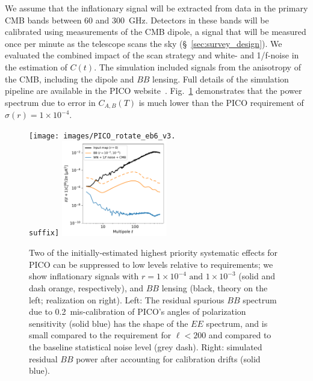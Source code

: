 \documentclass[PICOReport.tex]{subfiles}
\begin{document}
We assume that the inflationary signal will be extracted from data in the primary CMB bands between 60 and 300~GHz.  Detectors in these bands will be calibrated using measurements of the CMB dipole, a signal that will be measured once per minute as the telescope scans the sky (\S~\ref{sec:survey_design}).  We evaluated the combined impact of the scan strategy and white- and 1/f-noise in the estimation of $C(t)$.
The simulation included signals from the anisotropy of the CMB, including the dipole and $BB$ lensing. Full details of the simulation pipeline are available in the PICO website~\citep{picoweb_simulating}. Fig.~\ref{fig:rot_bb_tb_eb} demonstrates that the power spectrum due to error in $C_{A,B} (T)$ is much lower than the PICO requirement of $\sigma(r) = 1\times 10^{-4}$. 
\begin{figure}[thb]
\centerline{
\texttt{[image: images/PICO\_rotate\_eb6\_v3.\\suffix]} 
\hspace{0.3in}
\includegraphics[width=0.41\textwidth]{images/calibration_spectrum_BB.pdf} }
\vspace{-0.1in}
\caption{\captiontext
Two of the initially-estimated highest priority systematic effects for PICO can be suppressed to low levels relative to requirements; we show inflationary signals with  $r = 1\times 10^{-4}\,\, \mbox{and} \,\, 1\times 10^{-3}$ (solid and dash orange, respectively), and $BB$ lensing (black, theory on the left; realization on right). Left: The residual spurious $BB$ spectrum due to 0.2\arcmin\ mis-calibration of PICO's angles of polarization sensitivity (solid blue) has the shape of the $EE$ spectrum, and is small compared to the requirement for $\ell<200$ and compared to the baseline statistical noise level (grey dash). Right: simulated residual $BB$ power after accounting for calibration drifts (solid blue). 
\label{fig:rot_bb_tb_eb} }
\vspace{-0.1in}
\end{figure}
\end{document}
